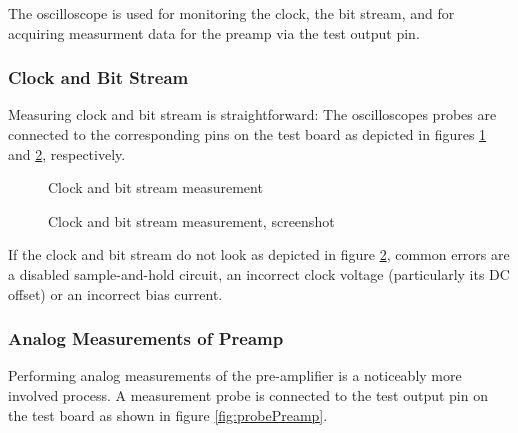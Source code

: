 

The oscilloscope  is used for  monitoring the clock,  the bit stream,  and for
acquiring measurment data for the preamp via the test output pin.

\subsubsection{Clock and Bit Stream}
\label{subsubsec:clockBitstream}

Measuring clock  and bit  stream is straightforward: The  oscilloscopes probes
are  connected  to the  corresponding  pins  on  the  test board  as  depicted
in figures  \ref{fig:clockBitStreamProbes} and \ref{fig:clockBitStreamScreen},
respectively.

\begin{figure}
    \centering
    \caption{Clock and bit stream measurement}
    \label{fig:clockBitStreamProbes}
\end{figure}

\begin{figure}
    \centering
    \caption{Clock and bit stream measurement, screenshot}
    \label{fig:clockBitStreamScreen}
\end{figure}

If  the   clock  and   bit  stream   do  not  look   as  depicted   in  figure
\ref{fig:clockBitStreamScreen}, common  errors are a  disabled sample-and-hold
circuit,  an  incorrect clock  voltage  (particularly  its  DC offset)  or  an
incorrect bias current.


\subsubsection{Analog Measurements of Preamp}
\label{subsubsec:analogMeasurements}

Performing  analog measurements  of  the pre-amplifier  is  a noticeably  more
involved process. A measurement  probe is connected to the test  output pin on
the test board as shown in figure \ref{fig:probePreamp}.

